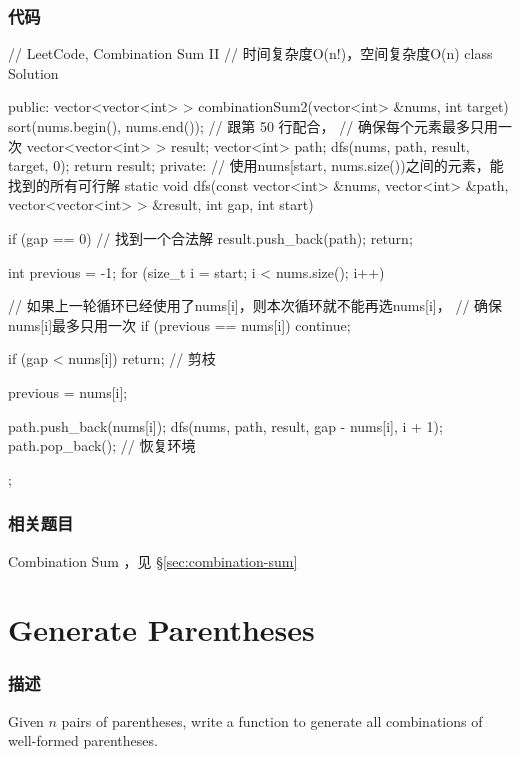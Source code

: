 \subsubsection{代码}
\begin{Code}
// LeetCode, Combination Sum II
// 时间复杂度O(n!)，空间复杂度O(n)
class Solution {
public:
    vector<vector<int> > combinationSum2(vector<int> &nums, int target) {
        sort(nums.begin(), nums.end()); // 跟第 50 行配合，
                                        // 确保每个元素最多只用一次
        vector<vector<int> > result;
        vector<int> path;
        dfs(nums, path, result, target, 0);
        return result;
    }
private:
    // 使用nums[start, nums.size())之间的元素，能找到的所有可行解
    static void dfs(const vector<int> &nums, vector<int> &path, 
            vector<vector<int> > &result, int gap, int start) {
        if (gap == 0) {  //  找到一个合法解
            result.push_back(path);
            return;
        }

        int previous = -1;
        for (size_t i = start; i < nums.size(); i++) {
            // 如果上一轮循环已经使用了nums[i]，则本次循环就不能再选nums[i]，
            // 确保nums[i]最多只用一次
            if (previous == nums[i]) continue;

            if (gap < nums[i]) return;  // 剪枝

            previous = nums[i];

            path.push_back(nums[i]);
            dfs(nums, path, result, gap - nums[i], i + 1);
            path.pop_back();  // 恢复环境
        }
    }
};
\end{Code}


\subsubsection{相关题目}
\begindot
\item Combination Sum ，见 \S \ref{sec:combination-sum}
\myenddot


\section{Generate Parentheses } %
\label{sec:generate-parentheses}


\subsubsection{描述}
Given $n$ pairs of parentheses, write a function to generate all combinations of well-formed parentheses.

